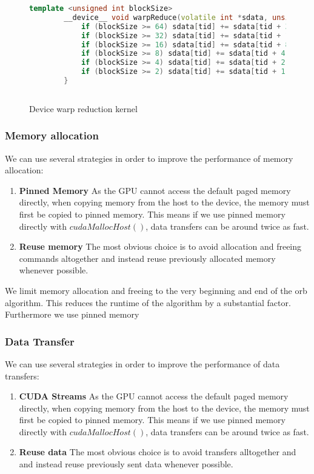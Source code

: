 \documentclass[]{article}
\begin{document}
\begin{figure}[H]
	\begin{lstlisting}[language=c++]
		template <unsigned int blockSize>
		__device__ void warpReduce(volatile int *sdata, unsigned int tid) {
			if (blockSize >= 64) sdata[tid] += sdata[tid + 32];
			if (blockSize >= 32) sdata[tid] += sdata[tid + 16];
			if (blockSize >= 16) sdata[tid] += sdata[tid + 8];
			if (blockSize >= 8) sdata[tid] += sdata[tid + 4];
			if (blockSize >= 4) sdata[tid] += sdata[tid + 2];
			if (blockSize >= 2) sdata[tid] += sdata[tid + 1];
		}
		
	\end{lstlisting}
	\caption{Device warp reduction kernel}
	\label{cuda:warp-device}
\end{figure}


\subsubsection{Memory allocation}

We can use several strategies in order to improve the performance of memory allocation: 

\begin{enumerate}
	\item \textbf{Pinned Memory} As the GPU cannot access the default paged memory directly, when copying memory from the host to the device, the memory must first be copied to pinned memory. This means if we use pinned memory directly with $cudaMallocHost()$, data transfers can be around twice as fast. 
	\item \textbf{Reuse memory} The most obvious choice is to avoid allocation and freeing commands altogether and instead reuse previously allocated memory whenever possible. 
\end{enumerate}

We limit memory allocation and freeing to the very beginning and end of the orb algorithm. This reduces the runtime of the algorithm by a substantial factor. Furthermore we use pinned memory

\subsubsection{Data Transfer}

We can use several strategies in order to improve the performance of data transfers: 

\begin{enumerate}
	\item \textbf{CUDA Streams} As the GPU cannot access the default paged memory directly, when copying memory from the host to the device, the memory must first be copied to pinned memory. This means if we use pinned memory directly with $cudaMallocHost()$, data transfers can be around twice as fast. 
	\item \textbf{Reuse data} The most obvious choice is to avoid transfers alltogether and and instead reuse previously sent data whenever possible. 
\end{enumerate}
\end{document}
